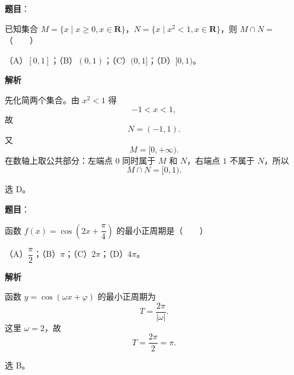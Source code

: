 

\begin{answer}

\textbf{题目}：

已知集合 $M=\{x\mid x\geqslant 0,x\in\mathbf R\}$，$N=\{x\mid x^2<1,x\in\mathbf R\}$，则 $M\cap N=$\mbox{（　　）}

（A）$[0,1]$；（B）$(0,1)$；（C）$(0,1]$；（D）$[0,1)$。

\textbf{解析}

先化简两个集合。由 $x^2<1$ 得
\nopagebreak[4]
\[-1<x<1,\]
故
\nopagebreak[4]
\[N=(-1,1).\]
又
\nopagebreak[4]
\[M=[0,+\infty).\]
在数轴上取公共部分：左端点 $0$ 同时属于 $M$ 和 $N$，右端点 $1$ 不属于 $N$，所以
\nopagebreak[4]
\[M\cap N=[0,1).\]

选 D。

\gkanswer{答案：D。$N=(-1,1)$，与 $M=[0,+\infty)$ 取交集得 $[0,1)$。}

\end{answer}
\begin{answer}

\textbf{题目}：

函数 $f(x)=\cos\left(2x+\dfrac\pi4\right)$ 的最小正周期是\mbox{（　　）}

（A）$\dfrac\pi2$；（B）$\pi$；（C）$2\pi$；（D）$4\pi$。

\textbf{解析}

函数 $y=\cos(\omega x+\varphi)$ 的最小正周期为
\nopagebreak[4]
\[T=\frac{2\pi}{|\omega|}.\]
这里 $\omega=2$，故
\nopagebreak[4]
\[T=\frac{2\pi}{2}=\pi.\]

选 B。


\end{answer}

